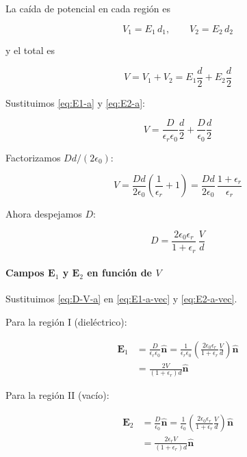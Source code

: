 \documentclass{article}
\begin{document}
La caída de potencial en cada región es

\[
V_{1} = E_{1}\,d_{1},
\qquad
V_{2} = E_{2}\,d_{2}
\]

y el total es

\begin{equation}
V = V_{1} + V_{2} = E_{1}\frac{d}{2} + E_{2}\frac{d}{2}
\label{eq:V-suma-a}
\end{equation}

Sustituimos \eqref{eq:E1-a} y \eqref{eq:E2-a}:

\begin{equation}
V = \frac{D}{\epsilon_{r}\epsilon_{0}}\frac{d}{2}
  + \frac{D}{\epsilon_{0}}\frac{d}{2}
\label{eq:V-a-paso1}
\end{equation}

Factorizamos $Dd/(2\epsilon_{0})$:

\begin{equation}
V = \frac{Dd}{2\epsilon_{0}}\left(\frac{1}{\epsilon_{r}} + 1\right)
= \frac{Dd}{2\epsilon_{0}}\,\frac{1+\epsilon_{r}}{\epsilon_{r}}
\label{eq:V-serie-a}
\end{equation}

Ahora despejamos $D$:

\begin{equation}
D = \frac{2\epsilon_{0}\epsilon_{r}}{1+\epsilon_{r}}\,\frac{V}{d}
\label{eq:D-V-a}
\end{equation}

\paragraph{Campos $\mathbf{E}_{1}$ y $\mathbf{E}_{2}$ en función de $V$}

Sustituimos \eqref{eq:D-V-a} en \eqref{eq:E1-a-vec} y \eqref{eq:E2-a-vec}.

Para la región I (dieléctrico):

\begin{align}
\mathbf{E}_{1} 
&= \frac{D}{\epsilon_{r}\epsilon_{0}}\hat{\mathbf{n}}
= \frac{1}{\epsilon_{r}\epsilon_{0}}
  \left(\frac{2\epsilon_{0}\epsilon_{r}}{1+\epsilon_{r}}\frac{V}{d}\right)\hat{\mathbf{n}}\\[4pt]
&= \frac{2V}{(1+\epsilon_{r})d}\hat{\mathbf{n}}
\label{eq:E1-V-a}
\end{align}

Para la región II (vacío):

\begin{align}
\mathbf{E}_{2} 
&= \frac{D}{\epsilon_{0}}\hat{\mathbf{n}}
= \frac{1}{\epsilon_{0}}
  \left(\frac{2\epsilon_{0}\epsilon_{r}}{1+\epsilon_{r}}\frac{V}{d}\right)\hat{\mathbf{n}}\\[4pt]
&= \frac{2\epsilon_{r}V}{(1+\epsilon_{r})d}\hat{\mathbf{n}}
\label{eq:E2-V-a}
\end{align}
\end{document}
